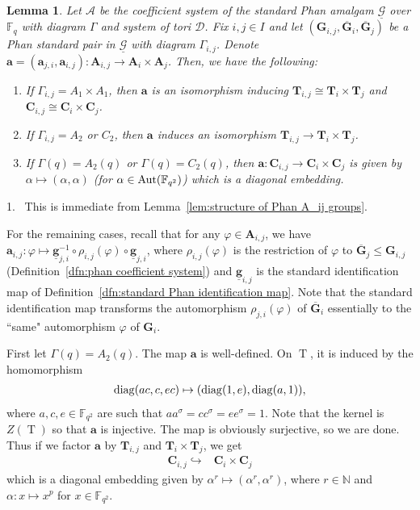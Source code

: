 \documentclass[12pt]{amsart}
\newtheorem{lemma}[theorem]{Lemma}
\theoremstyle{definition}
\newcommand{\bpf}{\noindent{\bf Proof}\hspace{7pt}}
\newcommand{\ble}{\begin{lemma}}
\newcommand{\ele}{\end{lemma}}
\newcommand{\ul}{\underline}
\newcommand{\into}{\hookrightarrow}
\newcommand{\cD}{{\mathcal D}}
\newcommand{\Aut}{\mathop{\rm Aut}\nolimits}
\renewcommand{\bar}{\overline}
\newcommand{\diag}{\mathop{\rm diag}\nolimits}
\def\cD{{\mathcal D}}
\newcommand{\FF}{{\mathbb F}}
\newcommand{\NN}{{\mathbb N}}
\newcommand{\after}{\mathbin{ \circ }}
\DeclareMathOperator{\GD}{T}
\newcommand{\amgrpA}{{\mathbf{A}}}
\newcommand{\amgrpC}{{\mathbf{C}}}
\newcommand{\amgrpG}{{\mathbf{G}}}
\newcommand{\amgrpT}{{\mathbf{T}}}
\newcommand{\ama}{{\mathbf a}}
\newcommand{\famg}{\ul{\mathbf g}}
\newcommand{\bamgrpG}{\bar{\amgrpG}}
\newcommand{\amA}{{\mathscr{A}}}
\newcommand{\famG}{\ul{\mathscr{G}}}
\newcommand{\liediag}{\Gamma}
\begin{document}
\ble\label{lem: Phan coefficient system connecting maps}
Let $\amA$ be the coefficient system of the standard Phan  amalgam $\famG$ over $\FF_q$ with diagram $\liediag$ and system of tori $\cD$. 
Fix $i,j\in I$ and let $(\amgrpG_{i,j},\bamgrpG_i,\bamgrpG_j)$ be a Phan standard pair in $\famG$ with diagram $\liediag_{i,j}$. Denote $\ama=(\ama_{j,i},\ama_{i,j})\colon \amgrpA_{i,j}\to \amgrpA_i\times\amgrpA_j$.
Then, we have the following:
\begin{enumerate}
\item If $\liediag_{i,j}=A_1\times A_1$, then $\ama$ is an isomorphism inducing $\amgrpT_{i,j}\cong\amgrpT_i\times\amgrpT_j$ and $\amgrpC_{i,j}\cong\amgrpC_i\times\amgrpC_j$.
\item If $\liediag_{i,j}=A_2$ or $C_2$, then $\ama$ induces an isomorphism $\amgrpT_{i,j}\to \amgrpT_i\times\amgrpT_j$.
\item If $\liediag(q)=A_2(q)$ or $\liediag(q)=C_2(q)$, then $\ama\colon\amgrpC_{i,j}\to \amgrpC_i\times\amgrpC_j$ is given by 
  $\alpha\mapsto (\alpha,\alpha)$ (for $\alpha\in \Aut(\FF_{q^2})$) which is a diagonal  embedding.
\end{enumerate}
\ele
\bpf
1.~ This is immediate from Lemma~\ref{lem:structure of Phan A_ij groups}.

For the remaining cases, recall that for any $\varphi\in \amgrpA_{i,j}$, we have 
 $\ama_{i,j}\colon \varphi\mapsto \famg_{j,i}^{-1}\after \rho_{i,j}(\varphi)\after\famg_{j,i}$, 
where $\rho_{i,j}(\varphi)$ is the restriction of $\varphi$ to $\bamgrpG_j\le \amgrpG_{i,j}$ (Definition~\ref{dfn:phan coefficient system}) and $\famg_{i,j}$ is the standard identification map of Definition~\ref{dfn:standard Phan identification map}.
Note that the standard identification map transforms the automorphism $\rho_{j,i}(\varphi)$ of $\bamgrpG_i$ essentially to the ``same" automorphism $\varphi$ of $\amgrpG_i$.

First let $\liediag(q)=A_2(q)$.
The map $\ama$ is well-defined. On $\GD$, it is induced by the homomorphism
 \begin{align*}
\diag(ac,c,ec) \mapsto (\diag(1,e), \diag(a,1)), 
 \end{align*}
where $a,c,e\in \FF_{q^2}$ are such that $aa^\sigma=cc^\sigma=ee^\sigma=1$.
Note that the kernel is $Z(\GD)$ so that $\ama$ is injective. The map is obviously surjective, so we are done.
Thus if we factor $\ama$ by $\amgrpT_{i,j}$ and $\amgrpT_i\times\amgrpT_j$, we get
\begin{align}
\amgrpC_{i,j}  \into &  \amgrpC_i\times\amgrpC_j \label{eqn:rho mod PGD}
 \end{align}
which is a diagonal embedding given by $\alpha^r\mapsto (\alpha^r,\alpha^r)$, where 
  $r\in \NN$ and $\alpha\colon x\mapsto x^p$ for $x\in \FF_{q^2}$.
\end{document}
